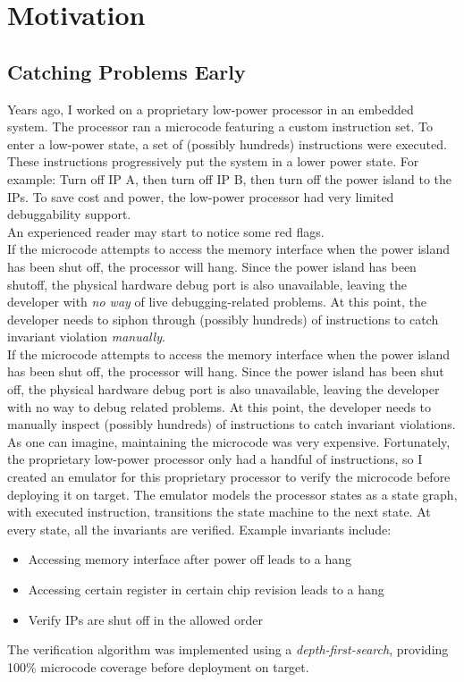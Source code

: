 
\chapter{Motivation}

\section{Catching Problems Early} 

Years ago, I worked on a proprietary low-power processor in an embedded
system. The processor ran a microcode featuring a custom instruction set. To
enter a low-power state, a set of (possibly hundreds) instructions were
executed. These instructions progressively put the system in a lower power state.
For example: Turn off IP A, then turn off IP B, then turn off the power island
to the IPs. To save cost and power, the low-power processor had very limited
debuggability support.\\

An experienced reader may start to notice some red flags.\\

If the microcode attempts to access the memory interface when the power
island has been shut off, the processor will hang. Since the power island has
been shutoff, the physical hardware debug port is also unavailable, leaving the
developer with \textit{no way} of live debugging-related problems. At this point,
the developer needs to siphon through (possibly hundreds) of instructions to
catch invariant violation \textit{manually}.\\

If the microcode attempts to access the memory interface when the power
island has been shut off, the processor will hang. Since the power island has
been shut off, the physical hardware debug port is also unavailable, leaving
the developer with no way to debug related problems. At this point, the
developer needs to manually inspect (possibly hundreds) of instructions to catch
invariant violations.\\

As one can imagine, maintaining the microcode was very expensive.
Fortunately, the proprietary low-power processor only had a handful of
instructions, so I created an emulator for this proprietary processor to verify
the microcode before deploying it on target. The emulator models the processor
states as a state graph, with executed instruction, transitions the state machine
to the next state. At every state, all the invariants are verified. Example
invariants include:
\begin{itemize} 
    \item Accessing memory interface after power off leads to a hang 
    \item Accessing certain register in certain chip revision leads to a hang \item Verify IPs are shut off in the allowed order
\end{itemize}
The verification algorithm was implemented using a \textit{depth-first-search},
providing 100\% microcode coverage before deployment on target.\\

